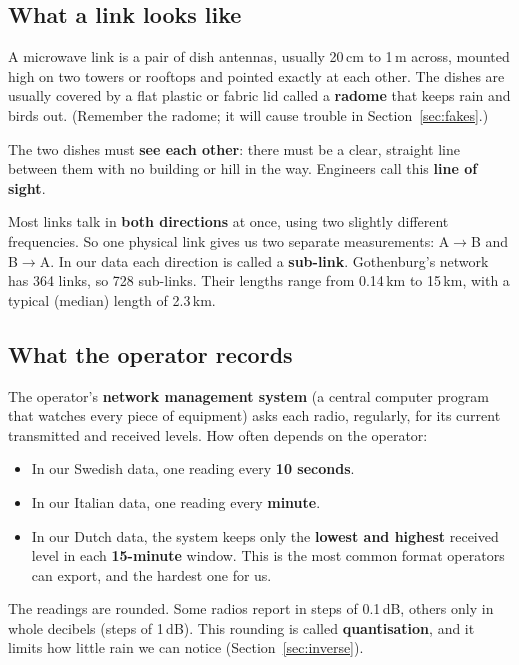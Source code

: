 \documentclass[11pt,a4paper]{article}
\begin{document}
\subsection{What a link looks like}

A microwave link is a pair of dish antennas, usually 20\,cm to 1\,m across, mounted high on two
towers or rooftops and pointed exactly at each other. The dishes are usually covered by a flat
plastic or fabric lid called a \textbf{radome} that keeps rain and birds out. (Remember the
radome; it will cause trouble in Section~\ref{sec:fakes}.)

The two dishes must \textbf{see each other}: there must be a clear, straight line between them with no
building or hill in the way. Engineers call this \textbf{line of sight}.

Most links talk in \textbf{both directions} at once, using two slightly different frequencies. So one
physical link gives us two separate measurements: A$\to$B and B$\to$A. In our data each direction is
called a \textbf{sub-link}. Gothenburg's network has 364 links, so 728 sub-links. Their lengths range
from 0.14\,km to 15\,km, with a typical (median) length of 2.3\,km.

\subsection{What the operator records}

The operator's \textbf{network management system} (a central computer program that watches every
piece of equipment) asks each radio, regularly, for its current transmitted and received levels.
How often depends on the operator:
\begin{itemize}
\item In our Swedish data, one reading every \textbf{10 seconds}.
\item In our Italian data, one reading every \textbf{minute}.
\item In our Dutch data, the system keeps only the \textbf{lowest and highest} received level in each
\textbf{15-minute} window. This is the most common format operators can export, and the hardest one
for us.
\end{itemize}
The readings are rounded. Some radios report in steps of 0.1\,dB, others only in whole decibels
(steps of 1\,dB). This rounding is called \textbf{quantisation}, and it limits how little rain we
can notice (Section~\ref{sec:inverse}).

\end{document}
